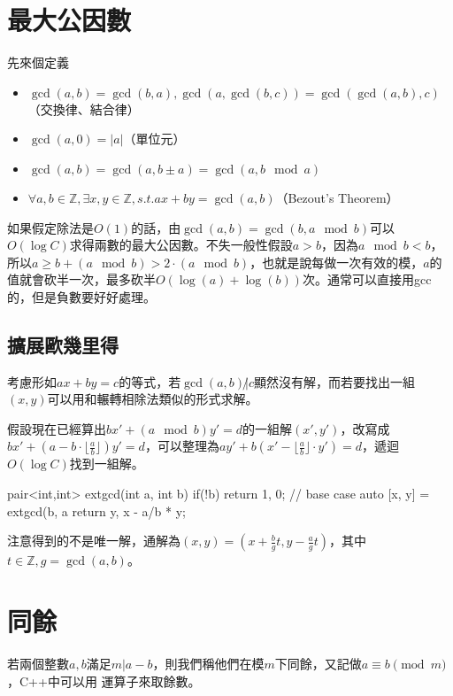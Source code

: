 \section{最大公因數}
先來個定義

\begin{itemize}
\item $\gcd(a,b) = \gcd(b,a), \gcd(a,\gcd(b,c)) = \gcd(\gcd(a,b), c)$（交換律、結合律）
\item $\gcd(a,0) = |a|$（單位元）
\item $\gcd(a,b) = \gcd(a, b \pm a) = \gcd(a, b \mod a)$
\item $\forall a,b \in \mathbb{Z} , \exists x,y \in \mathbb{Z}, s.t. ax+by = \gcd(a,b)$（Bezout's Theorem）
\end{itemize}

如果假定除法是$O(1)$的話，由$\gcd(a,b)=\gcd(b,a \mod b)$可以$O(\log C)$求得兩數的最大公因數。不失一般性假設$a>b$，因為$a \mod b < b$，所以$a \geq b+(a \mod b) > 2\cdot(a \mod b)$，也就是說每做一次有效的模，$a$的值就會砍半一次，最多砍半$O(\log(a)+\log(b))$次。通常可以直接用gcc的，但是負數要好好處理。

\subsection{擴展歐幾里得}
考慮形如$ax+by=c$的等式，若$\gcd(a,b) {\not |} c$顯然沒有解，而若要找出一組$(x,y)$可以用和輾轉相除法類似的形式求解。

假設現在已經算出$bx' + (a \mod b)y' = d$的一組解$(x', y')$，改寫成$bx' + (a - b \cdot \lfloor \frac{a}{b} \rfloor)y' = d$，可以整理為$ay' + b(x' - \lfloor \frac{a}{b} \rfloor \cdot y') = d$，遞迴$O(\log C)$找到一組解。

\begin{C++}
pair<int,int> extgcd(int a, int b) {
	if(!b) return {1, 0}; // base case
	auto [x, y] = extgcd(b, a%
	return {y, x - a/b * y};
}
\end{C++}
注意得到的不是唯一解，通解為$(x,y) = (x+\frac{b}{g}t, y-\frac{a}{g}t)$，其中$t \in \mathbb{Z}, g=\gcd(a,b)$。

\section{同餘}
若兩個整數$a,b$滿足$m | a-b$，則我們稱他們在模$m$下同餘，又記做$a \equiv b \pmod m$，C++中可以用 \inline{\%} 運算子來取餘數。

